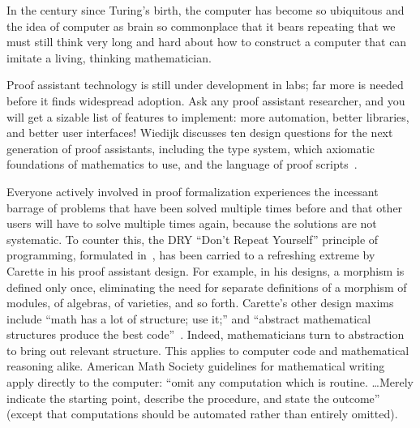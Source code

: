 \documentclass{llncs}
\def\princ#1{\smallskip\hfill\break\smallskip\centerline{\it #1\hfill}}
\begin{document}
In the century since Turing's birth, the computer has become so
ubiquitous and the idea of computer as brain so commonplace that it
bears repeating that we must still think very long and hard about how
to construct a computer that can imitate a living, thinking
mathematician.


Proof assistant technology is still under development in labs; far
more is needed before it finds widespread adoption.  Ask any proof
assistant researcher, and you will get a sizable list of features to
implement: more automation, better libraries, and better user
interfaces!  Wiedijk discusses ten design questions for the next
generation of proof assistants, including the type system, which
axiomatic foundations of mathematics to use, and the language of proof
scripts~\cite{Wie10}.

Everyone actively involved in proof formalization experiences the
incessant barrage of problems that have been solved multiple times
before and that other users will have to solve multiple times again,
because the solutions are not systematic.  To counter this, the DRY
``Don't Repeat Yourself'' principle of programming, formulated
in~\cite{PP00}, has been carried to a refreshing extreme by Carette in
his proof assistant design.  For example, in his designs, a morphism
is defined only once, eliminating the need for separate definitions of
a morphism of modules, of algebras, of varieties, and so forth.
Carette's other design maxims include ``math has a lot of structure;
use it;'' and ``abstract mathematical structures produce the best
code''~\cite{Car28p}.  Indeed, mathematicians turn to abstraction to
bring out relevant structure. This applies to computer code and
mathematical reasoning alike.  American Math Society guidelines for
mathematical writing apply directly to the computer: ``omit any
computation which is routine. \dots Merely indicate the starting
point, describe the procedure, and state the outcome''~\cite{DCFPS}
(except that computations should be automated rather than entirely
omitted).




\end{document}
